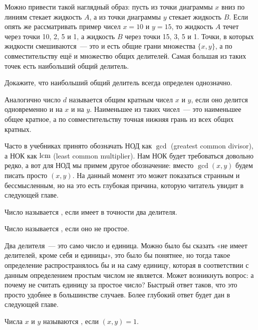 Можно привести такой наглядный образ: пусть из точки диаграммы $x$ вниз по линиям стекает жидкость $A$, а из точки диаграммы $y$ стекает жидкость $B$. Если опять же рассматривать пример чисел $x=10$ и $y=15$, то жидкость $A$ течет через точки 10, 2, 5 и 1, а жидкость $B$ через точки 15, 3, 5 и 1. Точки, в которых жидкости смешиваются~— это и есть общие грани множества $\{x, y\}$, а по совместительству ещё и множество общих делителей. Самая большая из таких точек есть наибольший общий делитель.

\begin{exercise}
Докажите, что наибольший общий делитель всегда определен однозначно.
\end{exercise}

Аналогично число $d$ называется общим кратным чисел $x$ и $y$, если оно делится одновременно и на $x$ и на $y$. Наименьшее из таких чисел~— это наименьшее общее кратное, а по совместительству точная нижняя грань из всех общих кратных.

Часто в учебниках принято обозначать НОД как $\gcd$ (greatest common divisor), а НОК как $\operatorname{lcm}$ (least common multiplier). Нам НОК будет требоваться довольно редко, а вот для НОД мы примем другое обозначение: вместо $\gcd(x, y)$ будем писать просто $(x, y)$. На данный момент это может показаться странным и бессмысленным, но на это есть глубокая причина, которую читатель увидит в следующей главе.

\begin{definition}
Число называется , если имеет в точности два делителя.
\end{definition}

\begin{definition}
Число называется , если оно не простое.
\end{definition}

Два делителя~— это само число и единица. Можно было бы сказать «не имеет делителей, кроме себя и единицы», это было бы понятнее, но тогда такое определение распространялось бы и на саму единицу, которая в соответствии с данным определением простым числом не является. Может возникнуть вопрос: а почему не считать единицу за простое число? Быстрый ответ таков, что это просто удобнее в большинстве случаев. Более глубокий ответ будет дан в следующей главе.

\begin{definition}
Числа $x$ и $y$ называются , если $(x, y) = 1$.
\end{definition}

